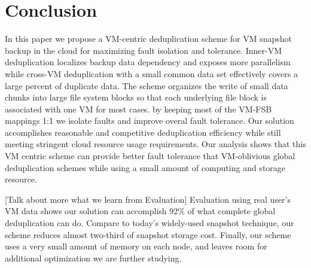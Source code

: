 \section{Conclusion}
\label{sect:final}
In this paper we propose a VM-centric deduplication scheme for 
VM snapshot backup in the cloud for maximizing fault isolation and tolerance. 
Inner-VM deduplication localizes backup data dependency and exposes more parallelism  
while cross-VM deduplication with a small common data set
effectively  covers a large percent of duplicate data.
The scheme organizes the write of small data chunks into large file system blocks so
that each underlying file block is associated with one VM for most cases.
by keeping most of the VM-FSB mappings 1:1 we isolate faults and improve overal fault tolerance.
Our solution accomplishes reasonable and competitive deduplication efficiency while
still meeting stringent cloud resource usage requirements. 
Our analysis shows that  this VM centric scheme 
can  provide  better fault tolerance that VM-oblivious global deduplication schemes
while using a small amount of computing and storage resource. 


[Talk about more what we learn from Evaluation]
Evaluation using real user's VM data shows
our solution can accomplish 92\% of what complete global
deduplication can do. 
Compare to today's widely-used snapshot technique, our scheme reduces almost
two-third of snapshot storage cost.
Finally, our scheme uses a very small amount of memory on each node, and leaves
room for additional optimization we are further studying.




 
